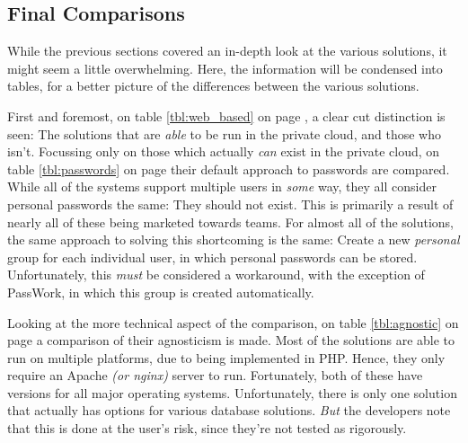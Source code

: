 		\subsection{Final Comparisons}
			\newcommand{\red}[1]{\cellcolor{red!50}#1}
			\newcommand{\green}[1]{\cellcolor{green!50}#1}
			\newcommand{\grey}[1]{\cellcolor{gray!50}#1}
			\newcommand{\yellow}[1]{\cellcolor{yellow!50}#1}
			\newcommand{\white}[1]{\cellcolor{white!50}#1}


			While the previous sections covered an in-depth look at the various solutions, it might seem a little overwhelming. Here, the information will be condensed into tables, for a better picture of the differences between the various solutions.

			First and foremost, on table \ref{tbl:web_based} on page \pageref{tbl:web_based}, a clear cut distinction is seen: The solutions that are \emph{able} to be run in the private cloud, and those who isn't. Focussing only on those which actually \emph{can} exist in the private cloud, on table \ref{tbl:passwords} on page \pageref{tbl:passwords} their default approach to passwords are compared. While all of the systems support multiple users in \emph{some} way, they all consider personal passwords the same: They should not exist. This is primarily a result of nearly all of these being marketed towards teams. For almost all of the solutions, the same approach to solving this shortcoming is the same: Create a new \emph{personal} group for each individual user, in which personal passwords can be stored. Unfortunately, this \emph{must} be considered a workaround, with the exception of PassWork, in which this group is created automatically. 

			Looking at the more technical aspect of the comparison, on table \ref{tbl:agnostic} on page \pageref{tbl:agnostic} a comparison of their agnosticism is made. Most of the solutions are able to run on multiple platforms, due to being implemented in PHP. Hence, they only require an Apache \emph{(or nginx)} server to run. Fortunately, both of these have versions for all major operating systems. Unfortunately, there is only one solution that actually has options for various database solutions. \emph{But} the developers note that this is done at the user's risk, since they're not tested as rigorously.



